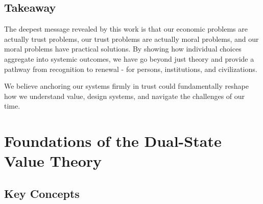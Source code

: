\documentclass[11pt,oneside]{book}
\begin{document}
\section{Takeaway}

The deepest message revealed by this work is that our economic problems are actually trust problems, our trust problems are actually moral problems, and our moral problems have practical solutions. By showing how individual choices aggregate into systemic outcomes, we have go beyond just theory and provide a pathway from recognition to renewal - for persons, institutions, and civilizations.

We believe anchoring our systems firmly in trust could fundamentally reshape how we understand value, design systems, and navigate the challenges of our time.



\chapter{ Foundations of the Dual-State Value Theory}

\section{Key Concepts}
\end{document}
